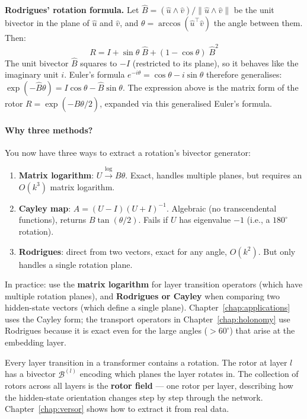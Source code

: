 \documentclass[11pt, twoside, openright]{memoir}
\newcommand{\op}{\wedge}          %
\newcommand{\bivec}[1]{\mathcal{B}^{(#1)}}  %
\begin{document}
\begin{gabox}
\textbf{Rodrigues' rotation formula.}
Let $\hat{B} = (\hat{u} \op \hat{v}) / \|\hat{u} \op \hat{v}\|$ be the
unit bivector in the plane of $\hat{u}$ and $\hat{v}$, and
$\theta = \arccos(\hat{u}^\top \hat{v})$ the angle between them.  Then:
\[
  R = I + \sin\theta \; \hat{B} + (1 - \cos\theta) \; \hat{B}^2
\]
The unit bivector $\hat{B}$ squares to $-I$ (restricted to its plane),
so it behaves like the imaginary unit $i$.  Euler's formula
$e^{-i\theta} = \cos\theta - i\sin\theta$ therefore generalises:
$\exp(-\hat{B}\theta) = I\cos\theta - \hat{B}\sin\theta$.
The expression above is the matrix form of the rotor
$R = \exp(-\hat{B}\theta/2)$, expanded via this generalised Euler's
formula.
\end{gabox}

\paragraph{Why three methods?}
You now have three ways to extract a rotation's bivector generator:
\begin{enumerate}[nosep]
\item \textbf{Matrix logarithm}: $U \xrightarrow{\log} B\theta$.  Exact,
  handles multiple planes, but requires an $O(k^3)$ matrix logarithm.
\item \textbf{Cayley map}: $A = (U-I)(U+I)^{-1}$.  Algebraic (no
  transcendental functions), returns $B\tan(\theta/2)$.  Fails if $U$
  has eigenvalue $-1$ (i.e., a $180^\circ$ rotation).
\item \textbf{Rodrigues}: direct from two vectors, exact for any angle,
  $O(k^2)$.  But only handles a single rotation plane.
\end{enumerate}

In practice: use the \textbf{matrix logarithm} for layer transition
operators (which have multiple rotation planes), and
\textbf{Rodrigues or Cayley} when comparing two hidden-state vectors
(which define a single plane).  Chapter~\ref{chap:applications} uses
the Cayley form; the transport operators in
Chapter~\ref{chap:holonomy} use Rodrigues because it is exact even for
the large angles ($>60^\circ$) that arise at the embedding layer.

\begin{transformer}
Every layer transition in a transformer contains a rotation.  The rotor
at layer $l$ has a bivector $\bivec{l}$ encoding which planes the layer
rotates in.  The collection of rotors across all layers is the
\textbf{rotor field} --- one rotor per layer, describing how the
hidden-state orientation changes step by step through the network.
Chapter~\ref{chap:versor} shows how to extract it from real data.
\end{transformer}
\end{document}
